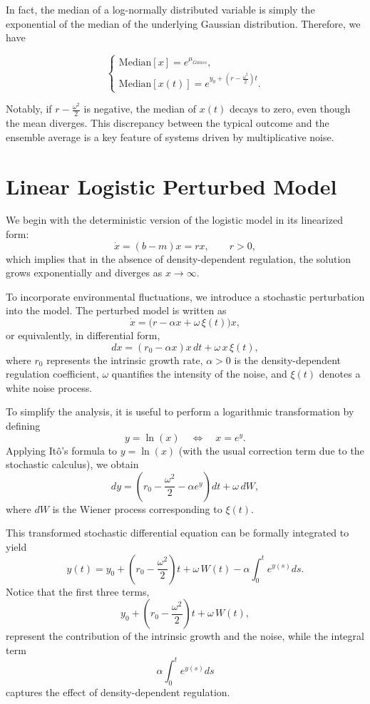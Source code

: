 In fact, the median of a log-normally distributed variable is simply the exponential of the median of the underlying Gaussian distribution. Therefore, we have

$$
\begin{cases}
\text{Median}[x] = e^{\mu_{Gauss}}, \\
\text{Median}[x(t)] = e^{y_0 + \left(r - \frac{\omega^2}{2}\right)t}.
\end{cases}
$$

Notably, if $r - \frac{\omega^2}{2}$ is negative, the median of $x(t)$ decays to zero, even though the mean diverges. This discrepancy between the typical outcome and the ensemble average is a key feature of systems driven by multiplicative noise.

\section{Linear Logistic Perturbed Model}

We begin with the deterministic version of the logistic model in its linearized form:
$$
\dot{x} = (b - m)x = rx, \quad \quad r > 0,
$$
which implies that in the absence of density-dependent regulation, the solution grows exponentially and diverges as $x \to \infty$. 

To incorporate environmental fluctuations, we introduce a stochastic perturbation into the model. The perturbed model is written as
$$
\dot{x} = \bigl(r - \alpha x + \omega\,\xi(t)\bigr)x,
$$
or equivalently, in differential form,
$$
dx = (r_0 - \alpha x)x\,dt + \omega\,x\,\xi(t),
$$
where $r_0$ represents the intrinsic growth rate, $\alpha>0$ is the density-dependent regulation coefficient, $\omega$ quantifies the intensity of the noise, and $\xi(t)$ denotes a white noise process.

To simplify the analysis, it is useful to perform a logarithmic transformation by defining
$$
y = \ln(x) \quad \Longleftrightarrow \quad x = e^y.
$$
Applying Itô's formula to $y=\ln(x)$ (with the usual correction term due to the stochastic calculus), we obtain
$$
dy = \left(r_0 - \frac{\omega^2}{2} - \alpha e^y\right)dt + \omega\,dW,
$$
where $dW$ is the Wiener process corresponding to $\xi(t)$.

This transformed stochastic differential equation can be formally integrated to yield
$$
y(t) = y_0 + \left(r_0 - \frac{\omega^2}{2}\right)t + \omega\,W(t) - \alpha\int_0^t e^{y(s)}ds.
$$
Notice that the first three terms, 
$$
y_0 + \left(r_0 - \frac{\omega^2}{2}\right)t + \omega\,W(t),
$$
represent the contribution of the intrinsic growth and the noise, while the integral term
$$
\alpha\int_0^t e^{y(s)}ds
$$
captures the effect of density-dependent regulation. 


